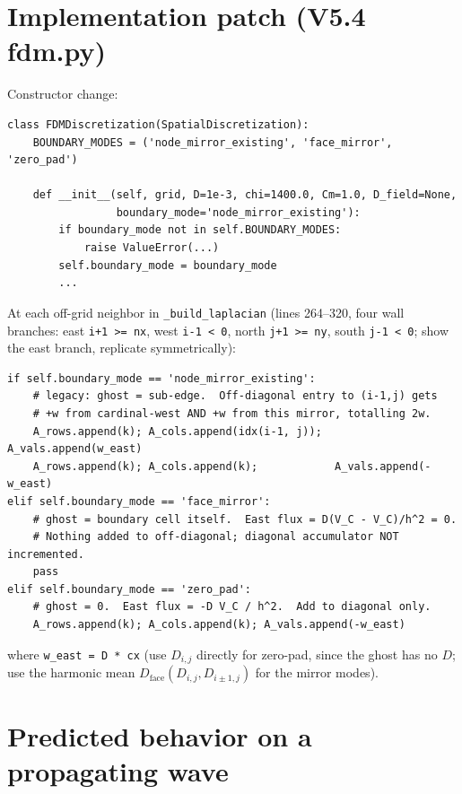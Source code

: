 \documentclass[11pt,letterpaper]{article}
\begin{document}
\section{Implementation patch (V5.4 fdm.py)}

Constructor change:
\begin{verbatim}
class FDMDiscretization(SpatialDiscretization):
    BOUNDARY_MODES = ('node_mirror_existing', 'face_mirror', 'zero_pad')

    def __init__(self, grid, D=1e-3, chi=1400.0, Cm=1.0, D_field=None,
                 boundary_mode='node_mirror_existing'):
        if boundary_mode not in self.BOUNDARY_MODES:
            raise ValueError(...)
        self.boundary_mode = boundary_mode
        ...
\end{verbatim}
%
At each off-grid neighbor in \texttt{\_build\_laplacian} (lines 264--320, four wall
branches: east \texttt{i+1 >= nx}, west \texttt{i-1 < 0}, north \texttt{j+1 >= ny},
south \texttt{j-1 < 0}; show the east branch, replicate symmetrically):
\begin{verbatim}
if self.boundary_mode == 'node_mirror_existing':
    # legacy: ghost = sub-edge.  Off-diagonal entry to (i-1,j) gets
    # +w from cardinal-west AND +w from this mirror, totalling 2w.
    A_rows.append(k); A_cols.append(idx(i-1, j)); A_vals.append(w_east)
    A_rows.append(k); A_cols.append(k);            A_vals.append(-w_east)
elif self.boundary_mode == 'face_mirror':
    # ghost = boundary cell itself.  East flux = D(V_C - V_C)/h^2 = 0.
    # Nothing added to off-diagonal; diagonal accumulator NOT incremented.
    pass
elif self.boundary_mode == 'zero_pad':
    # ghost = 0.  East flux = -D V_C / h^2.  Add to diagonal only.
    A_rows.append(k); A_cols.append(k); A_vals.append(-w_east)
\end{verbatim}
%
where \texttt{w\_east = D * cx} (use $D_{i,j}$ directly for zero-pad, since the ghost has no $D$; use the harmonic mean $D_\text{face}(D_{i,j}, D_{i\pm 1, j})$ for the mirror modes).

\section{Predicted behavior on a propagating wave}
\end{document}
